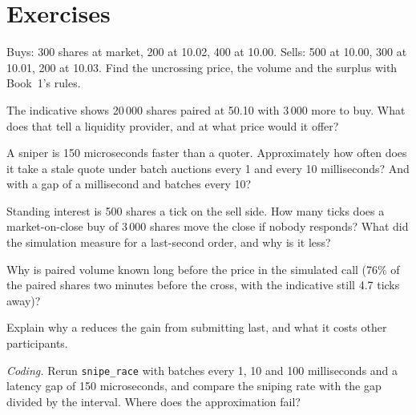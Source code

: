 \section{Exercises}

\begin{exercise}[$\star$]\label{exo:mx:auction-mechanics-and-theory:1}
Buys: 300 shares at market, 200 at 10.02, 400 at 10.00. Sells: 500 at 10.00, 300 at 10.01, 200 at 10.03. Find the uncrossing price, the volume and the
surplus with Book~1's rules.
\end{exercise}

\begin{exercise}[$\star$]\label{exo:mx:auction-mechanics-and-theory:2}
The indicative shows 20\,000 shares paired at 50.10 with 3\,000 more to buy. What does that tell a liquidity provider, and at what price would it offer?
\end{exercise}

\begin{exercise}[$\star$]\label{exo:mx:auction-mechanics-and-theory:3}
A sniper is 150 microseconds faster than a quoter. Approximately how often does it take a stale quote under batch auctions every 1 and every 10
milliseconds? And with a gap of a millisecond and batches every 10?
\end{exercise}

\begin{exercise}[$\star\star$]\label{exo:mx:auction-mechanics-and-theory:4}
Standing interest is 500 shares a tick on the sell side. How many ticks does a market-on-close buy of 3\,000 shares move the close if nobody responds? What
did the simulation measure for a last-second order, and why is it less?
\end{exercise}

\begin{exercise}[$\star\star$]\label{exo:mx:auction-mechanics-and-theory:5}
Why is paired volume known long before the price in the simulated call (76\% of the paired shares two minutes before the cross, with the indicative still
4.7 ticks away)?
\end{exercise}

\begin{exercise}[$\star\star$]\label{exo:mx:auction-mechanics-and-theory:6}
Explain why a  reduces the gain from submitting last, and what it costs other participants.
\end{exercise}

\begin{exercise}[$\star\star\star$]\label{exo:mx:auction-mechanics-and-theory:7}
\emph{Coding.} Rerun \texttt{snipe\_race} with batches every 1, 10 and 100 milliseconds and a latency gap of 150 microseconds, and compare the sniping rate
with the gap divided by the interval. Where does the approximation fail?
\end{exercise}

